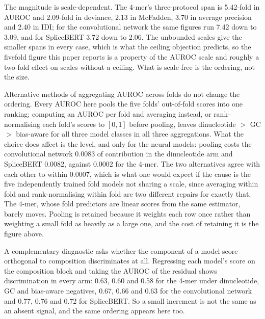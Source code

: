 The magnitude is scale-dependent. The 4-mer's
three-protocol span is 5.42-fold in AUROC and 2.09-fold in deviance, 2.13 in McFadden, 3.70 in
average precision and 2.40 in IDI; for the convolutional network the same figures run 7.42 down
to 3.09, and for SpliceBERT 3.72 down to 2.06. The unbounded scales give the smaller spans in
every case, which is what the ceiling objection predicts, so the fivefold figure this paper
reports is a property of the AUROC scale and roughly a two-fold effect on scales without a
ceiling. What is scale-free is the ordering, not the size.

Alternative methods of aggregating AUROC across folds do not change the ordering. Every AUROC
here pools the five folds' out-of-fold scores into one ranking;
computing an AUROC per fold and averaging instead, or rank-normalising each fold's scores to
$[0,1]$ before pooling, leaves dinucleotide $>$ GC $>$ bias-aware for all three model classes in
all three aggregations. What the choice does affect is the level, and only for the neural models:
pooling costs the convolutional network 0.0083 of contribution in the dinucleotide arm and
SpliceBERT 0.0082, against 0.0002 for the 4-mer. The two alternatives agree with each other to
within 0.0007, which is what one would expect if the cause is the five independently trained fold
models not sharing a scale, since averaging within fold and rank-normalising within fold are two
different repairs for exactly that. The 4-mer, whose fold predictors are linear scores from the
same estimator, barely moves. Pooling is retained because it weights each row once rather than
weighting a small fold as heavily as a large one, and the cost of retaining it is the figure
above.

A complementary diagnostic asks whether the component of a model score orthogonal to composition
discriminates at all. Regressing each model's score on the composition block and taking the
AUROC of the residual shows discrimination in every arm: 0.63, 0.60 and 0.58 for
the 4-mer under dinucleotide, GC and bias-aware negatives, 0.67, 0.66 and 0.63 for the
convolutional network and 0.77, 0.76 and 0.72 for SpliceBERT. So a small increment is not the
same as an absent signal, and the same ordering appears here too.


